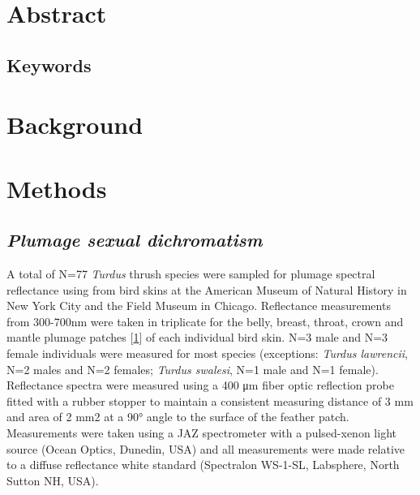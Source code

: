 \hypertarget{abstract}{%
\section{Abstract}\label{abstract}}

\hypertarget{keywords}{%
\subsection{Keywords}\label{keywords}}

\hypertarget{background}{%
\section{Background}\label{background}}

\hypertarget{methods}{%
\section{Methods}\label{methods}}

\hypertarget{plumage-sexual-dichromatism}{%
\subsection{\texorpdfstring{\emph{Plumage sexual
dichromatism}}{Plumage sexual dichromatism}}\label{plumage-sexual-dichromatism}}

A total of N=77 \emph{Turdus} thrush species were sampled for plumage
spectral reflectance using from bird skins at the American Museum of
Natural History in New York City and the Field Museum in Chicago.
Reflectance measurements from 300-700nm were taken in triplicate for the
belly, breast, throat, crown and mantle plumage patches
{[}\protect\hyperlink{ref-anderssonQuantifyingColors2006}{1}{]} of each
individual bird skin. N=3 male and N=3 female individuals were measured
for most species (exceptions: \emph{Turdus lawrencii}, N=2 males and N=2
females; \emph{Turdus swalesi}, N=1 male and N=1 female). Reflectance
spectra were measured using a 400 μm fiber optic reflection probe fitted
with a rubber stopper to maintain a consistent measuring distance of 3
mm and area of 2 mm2 at a 90° angle to the surface of the feather patch.
Measurements were taken using a JAZ spectrometer with a pulsed-xenon
light source (Ocean Optics, Dunedin, USA) and all measurements were made
relative to a diffuse reflectance white standard (Spectralon WS-1-SL,
Labsphere, North Sutton NH, USA).

